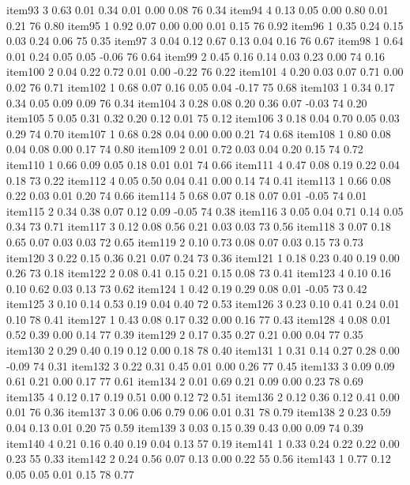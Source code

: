 \documentclass[10pt,man]{apa6}\usepackage{graphicx, color}
\begin{document}
\begin{Schunk}
\begin{Soutput}
item93    3 0.63 0.01 0.34 0.01 0.00  0.08 76 0.34
item94    4 0.13 0.05 0.00 0.80 0.01  0.21 76 0.80
item95    1 0.92 0.07 0.00 0.00 0.01  0.15 76 0.92
item96    1 0.35 0.24 0.15 0.03 0.24  0.06 75 0.35
item97    3 0.04 0.12 0.67 0.13 0.04  0.16 76 0.67
item98    1 0.64 0.01 0.24 0.05 0.05 -0.06 76 0.64
item99    2 0.45 0.16 0.14 0.03 0.23  0.00 74 0.16
item100   2 0.04 0.22 0.72 0.01 0.00 -0.22 76 0.22
item101   4 0.20 0.03 0.07 0.71 0.00  0.02 76 0.71
item102   1 0.68 0.07 0.16 0.05 0.04 -0.17 75 0.68
item103   1 0.34 0.17 0.34 0.05 0.09  0.09 76 0.34
item104   3 0.28 0.08 0.20 0.36 0.07 -0.03 74 0.20
item105   5 0.05 0.31 0.32 0.20 0.12  0.01 75 0.12
item106   3 0.18 0.04 0.70 0.05 0.03  0.29 74 0.70
item107   1 0.68 0.28 0.04 0.00 0.00  0.21 74 0.68
item108   1 0.80 0.08 0.04 0.08 0.00  0.17 74 0.80
item109   2 0.01 0.72 0.03 0.04 0.20  0.15 74 0.72
item110   1 0.66 0.09 0.05 0.18 0.01  0.01 74 0.66
item111   4 0.47 0.08 0.19 0.22 0.04  0.18 73 0.22
item112   4 0.05 0.50 0.04 0.41 0.00  0.14 74 0.41
item113   1 0.66 0.08 0.22 0.03 0.01  0.20 74 0.66
item114   5 0.68 0.07 0.18 0.07 0.01 -0.05 74 0.01
item115   2 0.34 0.38 0.07 0.12 0.09 -0.05 74 0.38
item116   3 0.05 0.04 0.71 0.14 0.05  0.34 73 0.71
item117   3 0.12 0.08 0.56 0.21 0.03  0.03 73 0.56
item118   3 0.07 0.18 0.65 0.07 0.03  0.03 72 0.65
item119   2 0.10 0.73 0.08 0.07 0.03  0.15 73 0.73
item120   3 0.22 0.15 0.36 0.21 0.07  0.24 73 0.36
item121   1 0.18 0.23 0.40 0.19 0.00  0.26 73 0.18
item122   2 0.08 0.41 0.15 0.21 0.15  0.08 73 0.41
item123   4 0.10 0.16 0.10 0.62 0.03  0.13 73 0.62
item124   1 0.42 0.19 0.29 0.08 0.01 -0.05 73 0.42
item125   3 0.10 0.14 0.53 0.19 0.04  0.40 72 0.53
item126   3 0.23 0.10 0.41 0.24 0.01  0.10 78 0.41
item127   1 0.43 0.08 0.17 0.32 0.00  0.16 77 0.43
item128   4 0.08 0.01 0.52 0.39 0.00  0.14 77 0.39
item129   2 0.17 0.35 0.27 0.21 0.00  0.04 77 0.35
item130   2 0.29 0.40 0.19 0.12 0.00  0.18 78 0.40
item131   1 0.31 0.14 0.27 0.28 0.00 -0.09 74 0.31
item132   3 0.22 0.31 0.45 0.01 0.00  0.26 77 0.45
item133   3 0.09 0.09 0.61 0.21 0.00  0.17 77 0.61
item134   2 0.01 0.69 0.21 0.09 0.00  0.23 78 0.69
item135   4 0.12 0.17 0.19 0.51 0.00  0.12 72 0.51
item136   2 0.12 0.36 0.12 0.41 0.00  0.01 76 0.36
item137   3 0.06 0.06 0.79 0.06 0.01  0.31 78 0.79
item138   2 0.23 0.59 0.04 0.13 0.01  0.20 75 0.59
item139   3 0.03 0.15 0.39 0.43 0.00  0.09 74 0.39
item140   4 0.21 0.16 0.40 0.19 0.04  0.13 57 0.19
item141   1 0.33 0.24 0.22 0.22 0.00  0.23 55 0.33
item142   2 0.24 0.56 0.07 0.13 0.00  0.22 55 0.56
item143   1 0.77 0.12 0.05 0.05 0.01  0.15 78 0.77

\end{Soutput}
\end{Schunk}
\end{document}
